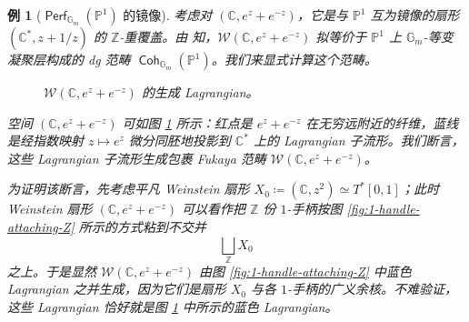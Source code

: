 \documentclass[11pt,a4paper]{article}
\DeclareMathOperator{\Coh}{\mathsf{Coh}}
\DeclareMathOperator{\Perf}{\mathsf{Perf}}
\theoremstyle{cnth}
\newtheorem{exmp}[thm]{例}
\begin{document}
\begin{exmp}[$\Perf_{\mathbb{G}_m} (\mathbb{P}^1)$ 的镜像]\label{exmp:mirror-to-Coh-G-P1}
    考虑对 $(\mathbb{C}, e^z+e^{-z})$，它是与 $\mathbb{P}^1$ 互为镜像的扇形 $(\mathbb{C}^{\ast},z+1/z)$ 的 $\mathbb{Z}$-重覆盖。由 \cite{FLTZ12} 知，$\mathcal{W} (\mathbb{C},e^z+e^{-z})$ 拟等价于 $\mathbb{P}^1$ 上 $\mathbb{G}_m$-等变凝聚层构成的 dg 范畴 $\Coh_{\mathbb{G}_m} (\mathbb{P}^1)$。我们来显式计算这个范畴。\par
    \begin{figure}[ht]
        \centering
        \caption{$\mathcal{W} (\mathbb{C}, e^z+e^{-z})$ 的生成 Lagrangian。}\label{fig:generating-Lag-equiv-P1}
    \end{figure}
    空间 $(\mathbb{C},e^z+e^{-z})$ 可如图 \ref{fig:generating-Lag-equiv-P1} 所示：红点是 $e^z+e^{-z}$ 在无穷远附近的纤维，蓝线是经指数映射 $z\mapsto e^z$ 微分同胚地投影到 $\mathbb{C}^{\ast}$ 上的 Lagrangian 子流形。我们断言，这些 Lagrangian 子流形生成包裹 Fukaya 范畴 $\mathcal{W} (\mathbb{C},e^z+e^{-z})$。\par
    为证明该断言，先考虑平凡 Weinstein 扇形 $X_0\coloneqq(\mathbb{C},z^2) \simeq T^{\ast} [0,1]$；此时 Weinstein 扇形 $(\mathbb{C},e^z+e^{-z})$ 可以看作把 $\mathbb{Z}$ 份 $1$-手柄按图 \ref{fig:1-handle-attaching-Z} 所示的方式粘到不交并
\[
        \bigsqcup_{\mathbb{Z}} X_0
    \]
    之上。于是显然 $\mathcal{W} (\mathbb{C},e^z+e^{-z})$ 由图 \ref{fig:1-handle-attaching-Z} 中蓝色 Lagrangian 之并生成，因为它们是扇形 $X_0$ 与各 $1$-手柄的广义余核。不难验证，这些 Lagrangian 恰好就是图 \ref{fig:generating-Lag-equiv-P1} 中所示的蓝色 Lagrangian。\par

\end{exmp}
\end{document}
